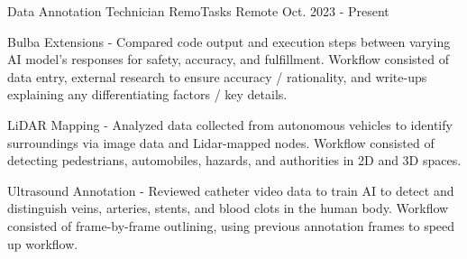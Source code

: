 

\begin{cventries}

  \cventry
    {Data Annotation Technician} %
    {RemoTasks} %
    {Remote} %
    {Oct. 2023 - Present} %
    {
      \begin{cvitems} %
		  \item {Bulba Extensions - Compared code output and execution steps between varying AI model's responses for safety, accuracy, and fulfillment. Workflow consisted of data entry, external research to ensure accuracy / rationality, and write-ups explaining any differentiating factors / key details.}
		  \item {LiDAR Mapping - Analyzed data collected from autonomous vehicles to identify surroundings via image data and Lidar-mapped nodes. Workflow consisted of detecting pedestrians, automobiles, hazards, and authorities in 2D and 3D spaces.}
		  \item {Ultrasound Annotation - Reviewed catheter video data to train AI to detect and distinguish veins, arteries, stents, and blood clots in the human body. Workflow consisted of frame-by-frame outlining, using previous annotation frames to speed up workflow.}
      \end{cvitems}
    }


\end{cventries}
